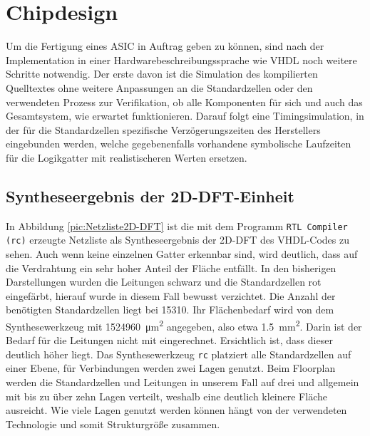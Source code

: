  
 
 \section{Chipdesign}
Um die Fertigung eines ASIC in Auftrag geben zu können, sind nach der Implementation in einer Hardwarebeschreibungssprache wie VHDL noch weitere Schritte notwendig.
Der erste davon ist die Simulation des kompilierten Quelltextes ohne weitere Anpassungen an die Standardzellen oder den verwendeten Prozess zur Verifikation, ob alle 
Komponenten für sich und auch das Gesamtsystem, wie erwartet funktionieren.
Darauf folgt eine Timingsimulation, in der für die Standardzellen spezifische Verzögerungszeiten des Herstellers eingebunden werden, welche gegebenenfalls vorhandene 
symbolische Laufzeiten für die Logikgatter mit realistischeren Werten ersetzen.



 
 \subsection{Syntheseergebnis der 2D-DFT-Einheit}
 In Abbildung \ref{pic:Netzliste2D-DFT} ist die mit dem Programm \texttt{RTL Compiler (rc)} erzeugte Netzliste als Syntheseergebnis der 2D-DFT des VHDL-Codes zu sehen.
 Auch wenn keine einzelnen Gatter erkennbar sind, wird deutlich, dass auf die Verdrahtung ein sehr hoher Anteil der Fläche entfällt.
 In den bisherigen Darstellungen wurden die Leitungen schwarz und die Standardzellen rot eingefärbt, hierauf wurde in diesem Fall bewusst verzichtet.
 Die Anzahl der benötigten Standardzellen liegt bei \num{15310}. Ihr Flächenbedarf wird von dem Synthesewerkzeug mit \SI{1524960}{\um^2} angegeben, also etwa 
 \SI{1,5}{mm^2}. Darin ist der Bedarf für die Leitungen nicht mit eingerechnet. Ersichtlich ist, dass dieser deutlich höher liegt. 
 Das Synthesewerkzeug \texttt{rc} platziert alle Standardzellen auf einer Ebene, für Verbindungen werden zwei Lagen genutzt.
 Beim Floorplan werden die Standardzellen und Leitungen in unserem Fall auf drei und allgemein mit bis zu über zehn Lagen verteilt,
 weshalb eine deutlich kleinere Fläche ausreicht. Wie viele Lagen genutzt werden können hängt von der verwendeten Technologie und somit Strukturgröße zusammen.
 
